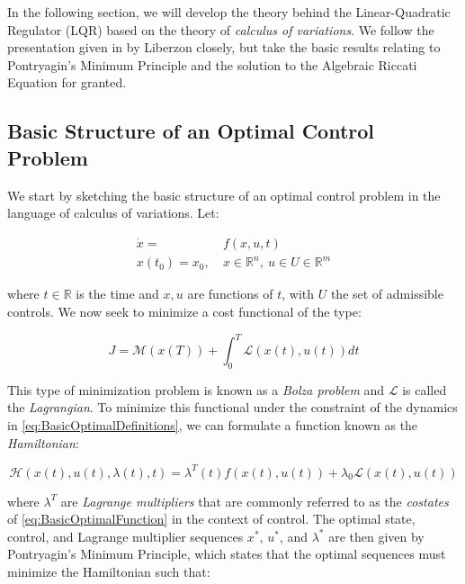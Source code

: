 In the following section, we will develop the theory behind the Linear-Quadratic Regulator (LQR) based on the theory of \textit{calculus of variations}. We follow the presentation given in \cite{Liberzon2012} by Liberzon closely, but take the basic results relating to Pontryagin's Minimum Principle and the solution to the Algebraic Riccati Equation for granted.

\subsection{Basic Structure of an Optimal Control Problem}\label{subsec:BasicOptimalControl}

We start by sketching the basic structure of an optimal control problem in the language of calculus of variations. Let:

\begin{align}
\dot{x} = &f(x,u,t) \label{eq:BasicOptimalFunction} \\ 
x(t_0) = x_0, \ &x \in \mathbb{R}^n, \ u \in U \in \mathbb{R}^m \label{eq:BasicOptimalDefinitions}
\end{align}

where $t \in \mathbb{R}$ is the time and $x,u$ are functions of $t$, with $U$ the set of admissible controls. We now seek to minimize a cost functional of the type:

\begin{equation}\label{eq:BolzaProblem}
	J = \mathcal{M}(x(T)) + \int_{0}^{T} \mathcal{L}(x(t),u(t)) dt
\end{equation} 

This type of minimization problem is known as a \textit{Bolza problem} and $\mathcal{L}$ is called the \textit{Lagrangian}. To minimize this functional under the constraint of the dynamics in \cref{eq:BasicOptimalDefinitions}, we can formulate a function known as the \textit{Hamiltonian}:

\begin{equation}\label{eq:Hamiltonian}
\mathcal{H}(x(t),u(t),\lambda(t),t) = \lambda^T(t) f(x(t),u(t)) + \lambda_0\mathcal{L}(x(t),u(t))
\end{equation}

where $\lambda^T$ are \textit{Lagrange multipliers} that are commonly referred to as the \textit{costates} of \cref{eq:BasicOptimalFunction} in the context of control. The optimal state, control, and Lagrange multiplier sequences $x^*$, $u^*$, and $\lambda^*$ are then given by Pontryagin's Minimum Principle, which states that the optimal sequences must minimize the Hamiltonian such that:

